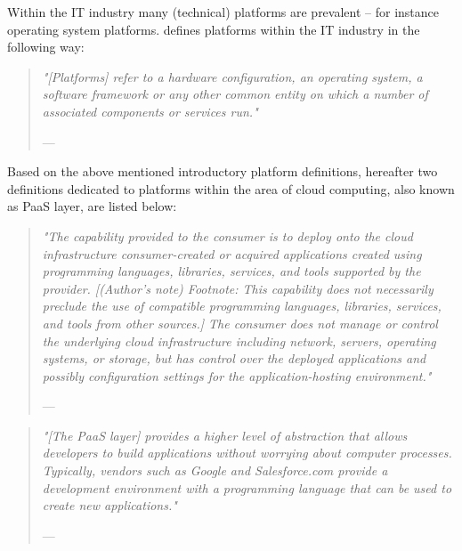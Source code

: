 Within the IT industry many (technical) platforms are prevalent -- for instance operating system platforms. \citet{Beimborn2011} defines platforms within the IT industry in the following way:

\begin{quote}{\slshape 
"[Platforms] refer to a hardware configuration, an operating system, a software framework or any other common entity on which a number of associated components or services run."}
\vspace*{-7pt}
\begin{flushright}
	--- \citet[p. 88]{Beimborn2011}
\end{flushright}
\end{quote}

Based on the above mentioned introductory platform definitions, hereafter two definitions dedicated to platforms within the area of cloud computing, also known as \ac{PaaS} layer, are listed below:

\begin{quote}{\slshape 
"The capability provided to the consumer is to deploy onto the cloud infrastructure consumer-created or acquired applications created using programming languages, libraries, services, and tools supported by the provider. [(Author's note) Footnote: This capability does not necessarily preclude the use of compatible programming languages, libraries, services, and tools from other sources.] The consumer does not manage or control the underlying cloud infrastructure including network, servers, operating systems, or storage, but has control over the deployed applications and possibly configuration settings for the application-hosting environment."}
\vspace*{-7pt}
\begin{flushright}
	--- \citet[p. 2-3]{Mell2011}
\end{flushright}
\end{quote}

\begin{quote}{\slshape 
"[The \ac{PaaS} layer] provides a higher level of abstraction that allows developers to build applications without worrying about computer processes. Typically, vendors such as Google and Salesforce.com provide a development environment with a programming language that can be used to create new applications."}
\vspace*{-7pt}
\begin{flushright}
	--- \citet[p. 118]{Iyer2010}
\end{flushright}
\end{quote}

